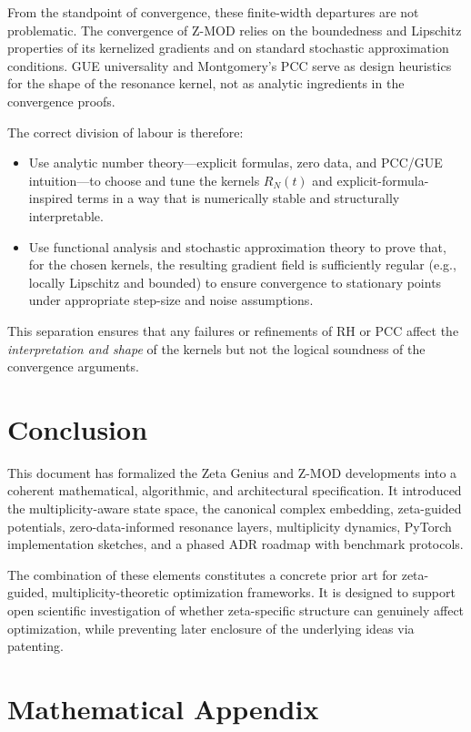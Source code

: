 \documentclass[11pt]{article}
\begin{document}
From the standpoint of convergence, these finite-width departures are not problematic. The convergence of Z-MOD relies on the boundedness and Lipschitz properties of its kernelized gradients and on standard stochastic approximation conditions. GUE universality and Montgomery's PCC serve as design heuristics for the shape of the resonance kernel, not as analytic ingredients in the convergence proofs.

\begin{remark}
The correct division of labour is therefore:
\begin{itemize}
  \item Use analytic number theory---explicit formulas, zero data, and PCC/GUE intuition---to choose and tune the kernels $R_N(t)$ and explicit-formula-inspired terms in a way that is numerically stable and structurally interpretable.
  \item Use functional analysis and stochastic approximation theory to prove that, for the chosen kernels, the resulting gradient field is sufficiently regular (e.g., locally Lipschitz and bounded) to ensure convergence to stationary points under appropriate step-size and noise assumptions.
\end{itemize}
This separation ensures that any failures or refinements of RH or PCC affect the \emph{interpretation and shape} of the kernels but not the logical soundness of the convergence arguments.
\end{remark}

\section{Conclusion}

This document has formalized the Zeta Genius and Z-MOD developments into a coherent mathematical, algorithmic, and architectural specification. It introduced the multiplicity-aware state space, the canonical complex embedding, zeta-guided potentials, zero-data-informed resonance layers, multiplicity dynamics, PyTorch implementation sketches, and a phased ADR roadmap with benchmark protocols.

The combination of these elements constitutes a concrete prior art for zeta-guided, multiplicity-theoretic optimization frameworks. It is designed to support open scientific investigation of whether zeta-specific structure can genuinely affect optimization, while preventing later enclosure of the underlying ideas via patenting.

\appendix
\section*{Mathematical Appendix}
\end{document}
